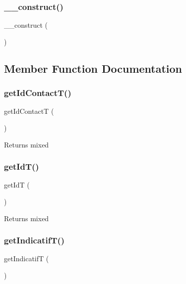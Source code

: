\subsubsection{\texorpdfstring{\+\_\+\+\_\+construct()}{\_\_construct()}}
{\footnotesize\ttfamily \+\_\+\+\_\+construct (\begin{DoxyParamCaption}{ }\end{DoxyParamCaption})}



\subsection{Member Function Documentation}
\mbox{\label{class_telephone_a505a6a187cd94f20d159e8e4ef22fcf6}} 
\subsubsection{\texorpdfstring{get\+Id\+Contact\+T()}{getIdContactT()}}
{\footnotesize\ttfamily get\+Id\+ContactT (\begin{DoxyParamCaption}{ }\end{DoxyParamCaption})}

\begin{DoxyReturn}{Returns}
mixed 
\end{DoxyReturn}
\mbox{\label{class_telephone_a1939d0f2b242d305ac70f72c53f2f20b}} 
\subsubsection{\texorpdfstring{get\+Id\+T()}{getIdT()}}
{\footnotesize\ttfamily get\+IdT (\begin{DoxyParamCaption}{ }\end{DoxyParamCaption})}

\begin{DoxyReturn}{Returns}
mixed 
\end{DoxyReturn}
\mbox{\label{class_telephone_accd08a1eee4717b029979baca902c535}} 
\subsubsection{\texorpdfstring{get\+Indicatif\+T()}{getIndicatifT()}}
{\footnotesize\ttfamily get\+IndicatifT (\begin{DoxyParamCaption}{ }\end{DoxyParamCaption})}

